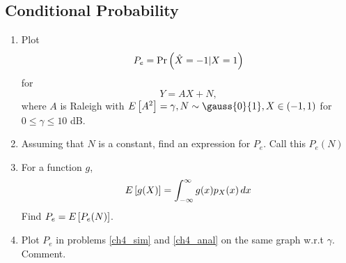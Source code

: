 \documentclass[journal,12pt,twocolumn]{IEEEtran}
\begin{document}
\begin{enumerate}[label=\thesection.\arabic*
,ref=\thesection.\theenumi]
\section{Conditional Probability}
\begin{enumerate}[label=\thesection.\arabic*
,ref=\thesection.\theenumi]
\item
\label{ch4_sim}
Plot
\begin{equation}
P_e = \Pr\left(\hat{X} = -1|X=1\right)
\end{equation}
%
for
\begin{equation}
Y = AX+N,
\end{equation}
where $A$ is Raleigh with $E\sbrak{A^2} = \gamma, N \sim \gauss{0}{1}, X \in \brak{-1,1}$ for $0 \le \gamma \le 10$ dB.
%
\item
Assuming that $N$ is a constant, find an expression for $P_e$.  Call this $P_e(N)$
%
\item
%
\label{ch4_anal}
For a function $g$,
\begin{equation}
E{}\left[g(X)\right] = \int_{-\infty}^{\infty}g(x)p_{X}(x)\, dx
\end{equation}
%
Find $P_e = E{}\left[P_e(N)\right]$.
%
\item
Plot $P_e$ in problems \ref{ch4_sim} and \ref{ch4_anal} on the same graph w.r.t $\gamma$.  Comment.
		\end{enumerate}

\end{enumerate}
\end{document}
